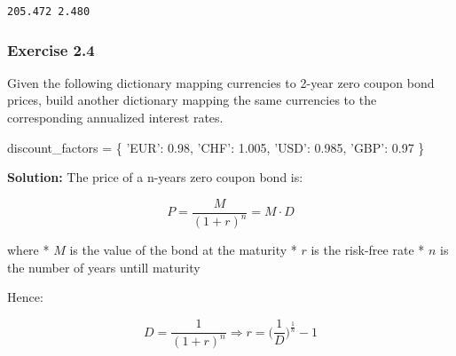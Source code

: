 \documentclass[11pt]{article}
\newenvironment{Shaded}{}{}
\newcommand{\FloatTok}[1]{\textcolor[rgb]{0.25,0.63,0.44}{{#1}}}
\newcommand{\StringTok}[1]{\textcolor[rgb]{0.25,0.44,0.63}{{#1}}}
\newcommand{\NormalTok}[1]{{#1}}
\newcommand{\OperatorTok}[1]{\textcolor[rgb]{0.40,0.40,0.40}{{#1}}}
\begin{document}
    \begin{Verbatim}[commandchars=\\\{\}]
205.472 2.480

    \end{Verbatim}

    \hypertarget{exercise-2.4}{%
\subsubsection{Exercise 2.4}\label{exercise-2.4}}

Given the following dictionary mapping currencies to 2-year zero coupon
bond prices, build another dictionary mapping the same currencies to the
corresponding annualized interest rates.

\begin{Shaded}
\begin{Highlighting}[]
\NormalTok{discount_factors }\OperatorTok{=}\NormalTok{ \{}
\StringTok{'EUR'}\NormalTok{: }\FloatTok{0.98}\NormalTok{,}
\StringTok{'CHF'}\NormalTok{: }\FloatTok{1.005}\NormalTok{,}
\StringTok{'USD'}\NormalTok{: }\FloatTok{0.985}\NormalTok{,}
\StringTok{'GBP'}\NormalTok{: }\FloatTok{0.97}
\NormalTok{\}}
\end{Highlighting}
\end{Shaded}

\textbf{Solution:} The price of a n-years zero coupon bond is:

\[ P = \frac{M}{(1+r)^{n}} = M\cdot D \]

where * \(M\) is the value of the bond at the maturity * \(r\) is the
risk-free rate * \(n\) is the number of years untill maturity

Hence:

\[ D = \frac{1}{(1+r)^{n}} \Longrightarrow r = \Big(\frac{1}{D}\Big)^{\frac{1}{n}} - 1\]
\end{document}
